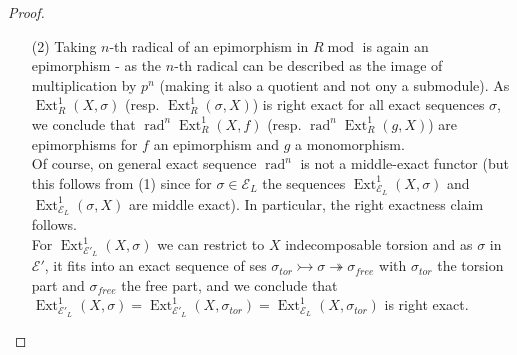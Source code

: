 \documentclass[10pt,a4paper]{amsart}
\DeclareMathOperator{\Ext}{Ext}
\DeclareMathOperator{\Hom}{Hom}
\DeclareMathOperator{\modu}{mod}
\DeclareMathOperator{\rad}{rad}
\newcommand{\defl}{\twoheadrightarrow}
\newcommand{\infl}{\rightarrowtail}
\newcommand{\mcE}{\mathcal{E}}
\begin{document}
\begin{proof}
\begin{itemize}
\begin{itemize}
    $\sigma_{n} \mapsto \sigma_{n+1} \mapsto \cdots \mapsto \sigma_{m-1}$
\end{itemize} 
We claim $\Ext^1_{\mcE_{[0,n]}}=\rad^n\Ext^1_R$. First observe that in $\mcE_L$: $R/P^a$ $1\leq a \leq n$ are injectives and they are also projectives. So for $s= \min (\ell ,m) \leq n$ we have $\Ext^1_{\mcE_{[0,n]}}(R/P^m, R/P^{\ell})=0$ and for $m\leq n $ we have $\Ext^1_{\mcE_{[0,n]}}(R/P^m, R)=0$. \\
So we may always assume wlog that $n< \min (\ell,m)$, then proceed by induction over $n$. For $n=1$, a short exact sequence of in $R\modu$ is in $\mcE_{[0,1]}$ iff the indcomposable summands of number of the indec. summands of the outer terms add up to the indec summands of the middle term. This means in case (a) all exact sequence are in this exact structure except $\sigma_{0, m+n}$ and $\sigma_{m+n,0}$, in case (b) all except $\sigma_0$. \\
For $n>1$, it is enough to observe that $\Hom (-, R/P^n)$ is 
\begin{itemize}
\item[(ad a1)] exact on $\sigma_{n, m+\ell -n}$ and not exact on  $\sigma_{n-1, m+\ell -n+1}$
\item[(ad a2)] exact on $\sigma_{\ell+m-n, n}$ and not exact on  $\sigma_{\ell +m -n+1, n-1}$
\item[(ad b)] exact on $\sigma_{n}$ and not exact on  $\sigma_{n-1}$
\end{itemize}
Then the rest follows by induction hypothesis. \\
Now, for $\mcE'_L$ one observes that $\Ext^1_{\mcE'_L}(X,Y)=\Ext^1_{\mcE_L}(X,Y)$ for all $X,Y$ torsion, and for $Y$ free it is zero.\\
As $\Ext^1_{\mcE'}(X,Y)=\Ext^1_R(X,Y)$ for all $X,Y$ torsion and for $Y$ free it is zero. Then the claim $\Ext^1_{\mcE'_L}$ follows from the proof for $\Ext^1_{\mcE_L}$. 
\item[(2)] Taking $n$-th radical of an epimorphism in $R \modu$ is again an epimorphism - as the $n$-th radical can be described as the image of multiplication by $p^n$ (making it also a quotient and not ony a submodule). As $\Ext^1_R(X, \sigma)$ (resp. $\Ext^1_R(\sigma, X)$) is right exact for all exact sequences $\sigma$, we conclude that $\rad^n \Ext^1_R(X, f)$ (resp. $\rad^n \Ext^1_R(g, X)$) are epimorphisms for $f$ an epimorphism and $g$ a monomorphism. \\
Of  course, on general exact sequence $\rad^n$ is not a middle-exact functor (but this follows from (1) since for $\sigma \in \mcE_L$ the sequences $\Ext^1_{\mcE_L}(X,\sigma)$ and $\Ext^1_{\mcE_L}(\sigma ,X)$ are middle exact). In particular, the right exactness claim follows. \\
For $\Ext^1_{\mcE'_L}(X,\sigma) $ we can restrict to $X$ indecomposable torsion and as $\sigma$ in $\mcE'$, it fits into an exact sequence of ses $\sigma_{tor}\infl \sigma \defl \sigma_{free}$ with $\sigma_{tor}$ the torsion part and $\sigma_{free}$ the free part, and we conclude that $\Ext^1_{\mcE'_L}(X,\sigma)= \Ext^1_{\mcE'_L} (X, \sigma_{tor}) =\Ext^1_{\mcE_L} (X, \sigma_{tor})$ is right exact.   
\end{itemize}
\end{proof}
\end{document}

